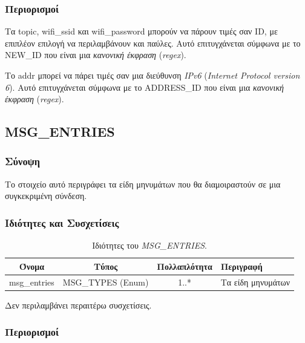 \subsubsection*{Περιορισμοί}

\noindent Τα topic, wifi\_ssid και wifi\_password μπορούν να πάρουν τιμές σαν ID, με επιπλέον επιλογή να περιλαμβάνουν και παύλες. Αυτό επιτυγχάνεται σύμφωνα με το NEW\_ID που είναι μια \textit{κανονική έκφραση} (\textit{regex}).

\noindent Το addr μπορεί να πάρει τιμές σαν μια διεύθυνση \textit{IPv6} (\textit{Internet Protocol version 6}). Αυτό επιτυγχάνεται σύμφωνα με το ADDRESS\_ID που είναι μια \textit{κανονική έκφραση} (\textit{regex}).

\subsection{MSG\_ENTRIES}
\label{subsec:msg_entries}

\subsubsection*{Σύνοψη}

\noindent Το στοιχείο αυτό περιγράφει τα είδη μηνυμάτων που θα διαμοιραστούν σε μια συγκεκριμένη σύνδεση.

\subsubsection*{Ιδιότητες και Συσχετίσεις}

\begin{table}[H]
	\begin{center}
		\caption{Ιδιότητες του \textit{MSG\_ENTRIES}.}
		\label{tab:msg_entries}
		\begin{tabular}{ | c | c | c| m{5.5cm} | }
			\hline
			\rowcolor{Gray}
			Όνομα & Τύπος & Πολλαπλότητα & Περιγραφή \\
			\hline
			msg\_entries & MSG\_TYPES (Enum) & 1..* & Τα είδη μηνυμάτων \\
			\hline
		\end{tabular}
	\end{center}
\end{table}

\noindent Δεν περιλαμβάνει περαιτέρω συσχετίσεις.

\subsubsection*{Περιορισμοί}

